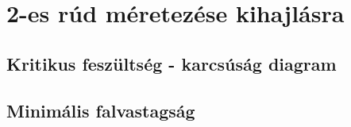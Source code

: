 \section{2-es rúd méretezése kihajlásra}

\subsection{Kritikus feszültség - karcsúság diagram}

\subsection{Minimális falvastagság}
